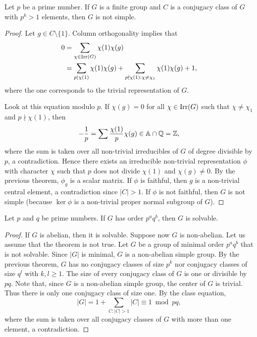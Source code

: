 \begin{theorem}[Burnside]
    \label{thm:pq_notsimple}
	Let $p$ be a prime number. If $G$ is a finite group and 
	$C$ is a conjugacy class of $G$ with $p^k>1$ elements, then $G$ 
	is not simple.
\end{theorem}

\begin{proof}
	Let $g\in C\setminus\{1\}$. Column orthogonality implies that 
	\begin{equation}
	\label{eq:Burnside}
	\begin{aligned}
		0&=\sum_{\chi\in\operatorname{Irr}(G)}\chi(1)\chi(g)\\
		&=\sum_{p\mid\chi(1)}\chi(1)\chi(g)+\sum_{p\nmid\chi(1):\chi\ne\chi_1}\chi(1)\chi(g)+1,
	\end{aligned}
	\end{equation}
	where the one corresponds to the trivial representation of
	$G$.
	
	Look at this equation modulo $p$. If $\chi(g)=0$ for all
	$\chi\in\operatorname{Irr}(G)$
	such that $\chi\ne\chi_1$ and $p\nmid\chi(1)$, then
	\[
	-\frac{1}{p}=\sum\frac{\chi(1)}{p}\chi(g)\in\mathbb{A}\cap\mathbb{Q}=\mathbb{Z},
	\]
	where the sum is taken over all non-trivial irreducibles
	of $G$ of degree divisible by $p$, a contradiction. Hence 
	there exists an irreducible non-trivial representation 
	$\phi$ with character $\chi$ such that $p$ does not divide
	$\chi(1)$ and $\chi(g)\ne0$. By the previous theorem, 
	$\phi_g$ is a scalar matrix. If $\phi$ is faithful, then 
	$g$ is a non-trivial central element, a contradiction since 
    $|C|>1$. If $\phi$ is not faithful, then 
    $G$ is not simple (because 
	$\ker\phi$ is a non-trivial proper normal subgroup of $G$). 
\end{proof}

\begin{theorem}[Burnside]
  \label{thm:pq}
  Let $p$ and $q$ be prime numbers. If $G$ has order $p^aq^b$, then $G$ is solvable.
\end{theorem}

\begin{proof}
	If $G$ is abelian, then it is solvable.
	Suppose now $G$ is non-abelian.
	Let us assume that the theorem is not true. Let $G$ be a group
	of minimal order $p^aq^b$
	that is not solvable. Since $|G|$ is minimal, $G$ is a non-abelian simple group.
	By the previous theorem, 
	$G$ has no conjugacy classes of size $p^k$ nor 
	conjugacy classes of size $q^l$ with $k,l\geq1$. The size
	of every conjugacy class of $G$ is one or divisible by $pq$. 
	Note that, since $G$ is a non-abelian simple group,
	the center of $G$ is trivial.
	Thus there is only one conjugacy class of size one.
	By the class
	equation,
	\[
		|G|=1+\sum_{C:|C|>1}|C|\equiv 1 \bmod pq,
	\]
	where the sum is taken over all conjugacy classes of $G$ 
	with more than one element, a contradiction.
\end{proof}

